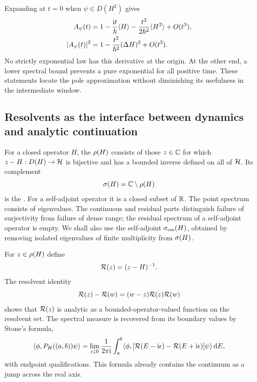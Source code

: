 Expanding at $t=0$ when $\psi\in D(H^2)$ gives
\begin{align}
  A_\psi(t)
  &=1-\frac{\mathrm{i} t}{\hbar}\langle H \rangle
    -\frac{t^2}{2\hbar^2}\langle H^2 \rangle+O(t^3),\\
  |A_\psi(t)|^2
  &=1-\frac{t^2}{\hbar^2}(\Delta H)^2+O(t^3).
  \label{eq:zeno-quadratic}
\end{align}
No strictly exponential law has this derivative at the origin.  At the other
end, a lower spectral bound prevents a pure exponential for all positive
time.  These statements locate the pole approximation without diminishing
its usefulness in the intermediate window.

\subsection{Resolvents as the interface between dynamics and analytic continuation}
\label{subsec:resolvent-interface}

For a closed operator $H$, the  $\rho(H)$ consists of
those $z\in\mathbb{C}$ for which $z-H:D(H)\to\mathcal{H}$ is bijective and has a
bounded inverse defined on all of $\mathcal{H}$.  Its complement
\begin{equation}
  \sigma(H)=\mathbb{C}\setminus\rho(H)
  \label{eq:spectrum-first-definition}
\end{equation}
is the .  For a self-adjoint operator it is a closed subset of
$\mathbb{R}$.  The point spectrum consists of eigenvalues.  The continuous and
residual parts distinguish failure of surjectivity from failure of dense
range; the residual spectrum of a self-adjoint operator is empty.  We shall
also use the self-adjoint 
$\sigma_{\mathrm{ess}}(H)$, obtained by removing isolated eigenvalues of
finite multiplicity from $\sigma(H)$.

For $z\in\rho(H)$ define
\begin{equation}
  \mathcal{R}(z)=(z-H)^{-1}.
  \label{eq:resolvent-definition-foundations}
\end{equation}
The resolvent identity
\begin{equation}
  \mathcal{R}(z)-\mathcal{R}(w)=(w-z)\mathcal{R}(z)\mathcal{R}(w)
  \label{eq:resolvent-identity-foundations}
\end{equation}
shows that $\mathcal{R}(z)$ is analytic as a bounded-operator-valued function on the
resolvent set.  The spectral measure is recovered from its boundary values by
Stone's formula,
\begin{equation}
  \langle \phi,P_H((a,b))\psi\rangle
  =\lim_{\epsilon\downarrow0}\frac{1}{2\pi\mathrm{i}}
   \int_a^b\langle \phi,
   [\mathcal{R}(E-\mathrm{i}\epsilon)-\mathcal{R}(E+\mathrm{i}\epsilon)]\psi\rangle\,\mathrm{d} E,
  \label{eq:stone-formula-foundations}
\end{equation}
with endpoint qualifications.  This formula already contains the continuum
as a jump across the real axis.

